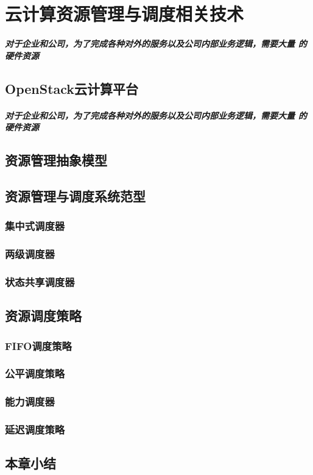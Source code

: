 
\chapter{云计算资源管理与调度相关技术}
\paragraph{对于企业和公司，为了完成各种对外的服务以及公司内部业务逻辑，需要大量
的硬件资源
}
\label{chap:outline}
\section{OpenStack云计算平台}
\paragraph{对于企业和公司，为了完成各种对外的服务以及公司内部业务逻辑，需要大量
的硬件资源
}
\section{资源管理抽象模型}
\section{资源管理与调度系统范型}
\subsection{集中式调度器}
\subsection{两级调度器}
\subsection{状态共享调度器}
\section{资源调度策略}
\subsection{FIFO调度策略}

\subsection{公平调度策略}
\subsection{能力调度器}
\subsection{延迟调度策略}
\section{本章小结}
